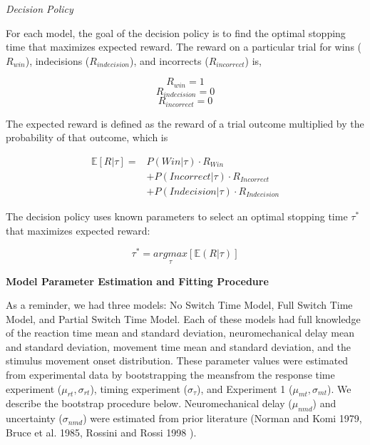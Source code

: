 \documentclass[12pt,letterpaper]{article}
\begin{document}
\noindent\emph{Decision Policy}

For each model, the goal of the decision policy is to find the optimal stopping time that maximizes expected reward. The reward on a particular trial for wins ($R_{win}$), indecisions ($R_{indecision}$), and incorrects ($R_{incorrect}$) is,

\begin{equation}
    R_{win} = 1
\end{equation}
\begin{equation}
    R_{indecision} = 0
\end{equation}
\begin{equation}
    R_{incorrect} = 0
\end{equation}

The expected reward is defined as the reward of a trial outcome multiplied by the probability of that outcome, which is

\begin{align}
    \mathbb{E}[R|\tau] = & P(Win|\tau) \cdot R_{Win} \nonumber \\ &+ P(Incorrect|\tau) \cdot R_{Incorrect} \nonumber \\ &+ P(Indecision|\tau) \cdot R_{Indecision}
\end{align}

The decision policy uses known parameters to select an optimal stopping time $\tau^*$ that maximizes expected reward:

\begin{equation}
    \tau^* = \underset{\tau}{argmax}[\mathbb{E}(R|\tau)]
\end{equation}

\noindent\textbf{Model Parameter Estimation and Fitting Procedure}

As a reminder, we had three models: No Switch Time Model, Full Switch Time Model, and Partial Switch Time Model. Each of these models had full knowledge of the reaction time mean and standard deviation, neuromechanical delay mean and standard deviation, movement time mean and standard deviation, and the stimulus movement onset distribution. These parameter values were estimated from experimental data by bootstrapping the meansfrom the response time experiment ($\mu_{rt}, \sigma_{rt}$), timing experiment ($\sigma_{\tau}$), and Experiment 1 ($\mu_{mt}, \sigma_{mt}$). We describe the bootstrap procedure below. Neuromechanical delay ($\mu_{nmd}$) and uncertainty ($\sigma_{nmd}$) were estimated from prior literature (Norman and Komi 1979, Bruce et al. 1985, Rossini and Rossi 1998 ).
\end{document}
